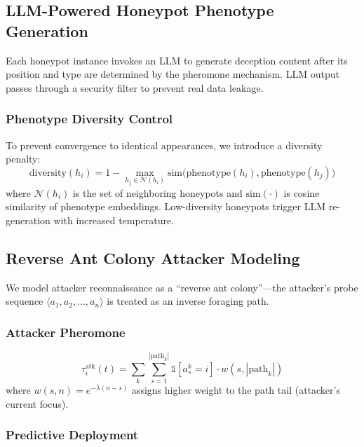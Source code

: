 \documentclass[review,3p,twocolumn]{elsarticle}
\newcommand{\calN}{\mathcal{N}}
\begin{document}
\subsection{LLM-Powered Honeypot Phenotype Generation}
\label{sec:framework:llm}

Each honeypot instance invokes an LLM to generate deception content after its position and type are determined by the pheromone mechanism. LLM output passes through a security filter to prevent real data leakage.

\subsubsection{Phenotype Diversity Control}

To prevent convergence to identical appearances, we introduce a diversity penalty:
\begin{equation}
\label{eq:diversity}
\mathrm{diversity}(h_i) = 1 - \max_{h_j \in \calN(h_i)} \mathrm{sim}\bigl(\mathrm{phenotype}(h_i), \mathrm{phenotype}(h_j)\bigr)
\end{equation}
where $\calN(h_i)$ is the set of neighboring honeypots and $\mathrm{sim}(\cdot)$ is cosine similarity of phenotype embeddings. Low-diversity honeypots trigger LLM re-generation with increased temperature.


\subsection{Reverse Ant Colony Attacker Modeling}
\label{sec:framework:reverse}

We model attacker reconnaissance as a ``reverse ant colony''---the attacker's probe sequence $\langle a_1, a_2, \ldots, a_n \rangle$ is treated as an inverse foraging path.

\subsubsection{Attacker Pheromone}
\begin{equation}
\label{eq:atk_pheromone}
\tau^{\mathrm{atk}}_i(t) = \sum_{k} \sum_{s=1}^{|\mathrm{path}_k|} \mathbb{1}[a_s^k = i] \cdot w(s, |\mathrm{path}_k|)
\end{equation}
where $w(s, n) = e^{-\lambda(n-s)}$ assigns higher weight to the path tail (attacker's current focus).

\subsubsection{Predictive Deployment}
\end{document}
